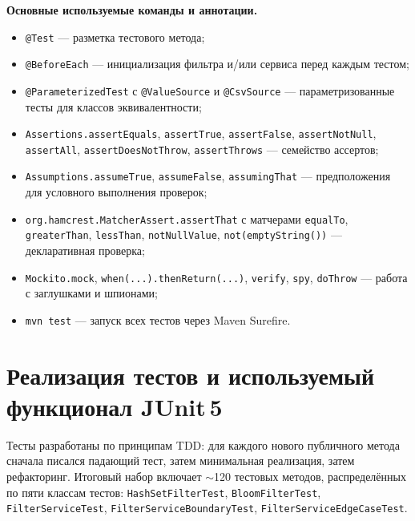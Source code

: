 \textbf{Основные используемые команды и аннотации.}
\begin{itemize}
    \item \texttt{@Test} --- разметка тестового метода;
    \item \texttt{@BeforeEach} --- инициализация фильтра и/или сервиса перед каждым тестом;
    \item \texttt{@ParameterizedTest} с \texttt{@ValueSource} и \texttt{@CsvSource} --- параметризованные тесты для классов эквивалентности;
    \item \texttt{Assertions.assertEquals}, \texttt{assertTrue}, \texttt{assertFalse}, \texttt{assertNotNull}, \texttt{assertAll}, \texttt{assertDoesNotThrow}, \texttt{assertThrows} --- семейство ассертов;
    \item \texttt{Assumptions.assumeTrue}, \texttt{assumeFalse}, \texttt{assumingThat} --- предположения для условного выполнения проверок;
    \item \texttt{org.hamcrest.MatcherAssert.assertThat} с матчерами \texttt{equalTo}, \texttt{greaterThan}, \texttt{lessThan}, \texttt{notNullValue}, \texttt{not(emptyString())} --- декларативная проверка;
    \item \texttt{Mockito.mock}, \texttt{when(...).thenReturn(...)}, \texttt{verify}, \texttt{spy}, \texttt{doThrow} --- работа с заглушками и шпионами;
    \item \texttt{mvn test} --- запуск всех тестов через Maven Surefire.
\end{itemize}

\section{Реализация тестов и используемый функционал JUnit\,5} \label{ch3:sec5}

Тесты разработаны по принципам TDD: для каждого нового публичного метода сначала писался падающий тест, затем минимальная реализация, затем рефакторинг. Итоговый набор включает $\sim$120 тестовых методов, распределённых по пяти классам тестов: \texttt{HashSetFilterTest}, \texttt{BloomFilterTest}, \texttt{FilterServiceTest}, \texttt{FilterServiceBoundaryTest}, \texttt{FilterServiceEdgeCaseTest}.

